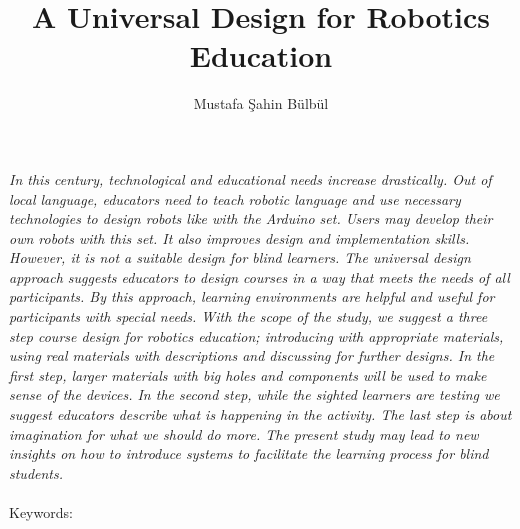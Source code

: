 \documentclass[11.5pt]{sig-alternate} %
\makeatletter
\let\oldabstract\abstract
\let\oldendabstract\endabstract
\renewenvironment{abstract} %
{\renewenvironment{quotation}%
               {\list{}{\addtolength{\leftmargin}{1em} %
                        \listparindent 1.5em%
                        \itemindent    \listparindent%
                        \rightmargin   \leftmargin%
                        \parsep        \z@ \@plus\p@}%
                \item\relax}%
               {\endlist}%
\oldabstract}
{\oldendabstract}
\makeatother
\begin{document}
\title{A Universal Design for Robotics Education}

\author[1]{\large \color{blue}Mustafa Şahin Bülbül}


\toappear{}
\maketitle
\begin{@twocolumnfalse} 
\begin{abstract}
\item 
\textit{In this century, technological and educational needs increase drastically. Out of local language, educators need to teach robotic language and use necessary technologies to design robots like with the Arduino set.  Users may develop their own robots with this set. It also improves design and implementation skills. However, it is not a suitable design for blind learners. The universal design approach suggests educators to design courses in a way that meets the needs of all participants. By this approach, learning environments are helpful and useful for participants with special needs. With the scope of the study, we suggest a three step course design for robotics education; introducing with appropriate materials, using real materials with descriptions and discussing for further designs. In the first step, larger materials with big holes and components will be used to make sense of the devices. In the second step, while the sighted learners are testing we suggest educators describe what is happening in the activity. The last step is about imagination for what we should do more. The present study may lead to new insights on how to introduce systems to facilitate the learning process for blind students.}
\\ \\
Keywords: 
\end{abstract}
\end{@twocolumnfalse}

\end{document}

